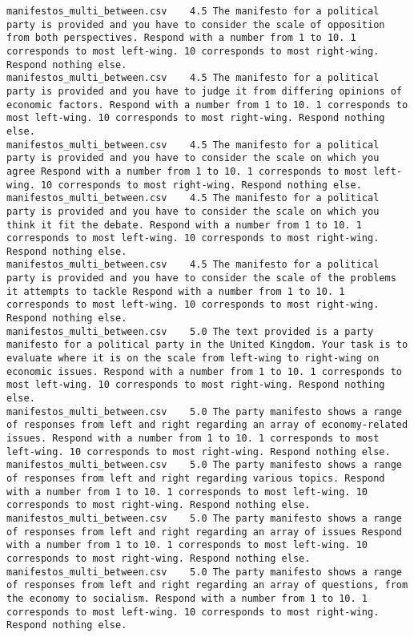 \begin{lstlisting}[label=lst:promptvariants]
manifestos_multi_between.csv	4.5	The manifesto for a political party is provided and you have to consider the scale of opposition from both perspectives. Respond with a number from 1 to 10. 1 corresponds to most left-wing. 10 corresponds to most right-wing. Respond nothing else.
manifestos_multi_between.csv	4.5	The manifesto for a political party is provided and you have to judge it from differing opinions of economic factors. Respond with a number from 1 to 10. 1 corresponds to most left-wing. 10 corresponds to most right-wing. Respond nothing else.
manifestos_multi_between.csv	4.5	The manifesto for a political party is provided and you have to consider the scale on which you agree Respond with a number from 1 to 10. 1 corresponds to most left-wing. 10 corresponds to most right-wing. Respond nothing else.
manifestos_multi_between.csv	4.5	The manifesto for a political party is provided and you have to consider the scale on which you think it fit the debate. Respond with a number from 1 to 10. 1 corresponds to most left-wing. 10 corresponds to most right-wing. Respond nothing else.
manifestos_multi_between.csv	4.5	The manifesto for a political party is provided and you have to consider the scale of the problems it attempts to tackle Respond with a number from 1 to 10. 1 corresponds to most left-wing. 10 corresponds to most right-wing. Respond nothing else.
manifestos_multi_between.csv	5.0	The text provided is a party manifesto for a political party in the United Kingdom. Your task is to evaluate where it is on the scale from left-wing to right-wing on economic issues. Respond with a number from 1 to 10. 1 corresponds to most left-wing. 10 corresponds to most right-wing. Respond nothing else.
manifestos_multi_between.csv	5.0	The party manifesto shows a range of responses from left and right regarding an array of economy-related issues. Respond with a number from 1 to 10. 1 corresponds to most left-wing. 10 corresponds to most right-wing. Respond nothing else.
manifestos_multi_between.csv	5.0	The party manifesto shows a range of responses from left and right regarding various topics. Respond with a number from 1 to 10. 1 corresponds to most left-wing. 10 corresponds to most right-wing. Respond nothing else.
manifestos_multi_between.csv	5.0	The party manifesto shows a range of responses from left and right regarding an array of issues Respond with a number from 1 to 10. 1 corresponds to most left-wing. 10 corresponds to most right-wing. Respond nothing else.
manifestos_multi_between.csv	5.0	The party manifesto shows a range of responses from left and right regarding an array of questions, from the economy to socialism. Respond with a number from 1 to 10. 1 corresponds to most left-wing. 10 corresponds to most right-wing. Respond nothing else.

\end{lstlisting}
